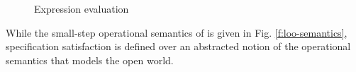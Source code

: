 \begin{figure}[hbp]
\begin{minipage}{\textwidth}
\footnotesize{
}
\caption{\LangOO Expression evaluation}
\label{f:evaluation}
\end{minipage}
\end{figure}

While the small-step operational semantics of \LangOO is given in Fig. \ref{f:loo-semantics},
specification satisfaction is defined over an abstracted notion of 
the operational semantics that models the open world. %




